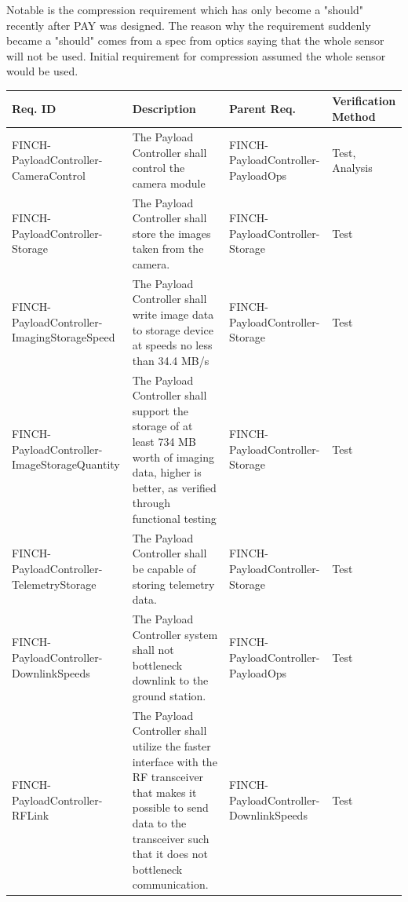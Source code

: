 \documentclass[12pt,a4paper]{article}
\begin{document}
Notable is the compression requirement which has only become a "should" recently after PAY was designed. The reason why the requirement suddenly became a "should" comes from a spec from optics saying that the whole sensor will not be used. Initial requirement for compression assumed the whole sensor would be used. 

    \begin{table}[H]
        \centering
        \begin{tabular}{|>{\centering\arraybackslash}m{3cm} 
                    |>{\raggedright\arraybackslash}m{7cm} 
                    |>{\centering\arraybackslash}m{3cm} 
                    |>{\centering\arraybackslash}m{2.5cm}|}\hline
            \textbf{Req. ID} & \centering \textbf{Description} & \textbf{Parent Req.} & \textbf{Verification Method}\\\hline
 FINCH-PayloadController-CameraControl& The Payload Controller shall control the camera module& FINCH-PayloadController-PayloadOps&Test, Analysis\\\hline
 FINCH-PayloadController-Storage& The Payload Controller shall store the images taken from the camera.& FINCH-PayloadController-Storage&Test\\\hline
 FINCH-PayloadController-ImagingStorageSpeed& The Payload Controller shall write image data to storage device at speeds no less than 34.4 MB/s& FINCH-PayloadController-Storage&Test\\\hline
 FINCH-PayloadController-ImageStorageQuantity& The Payload Controller shall support the storage of at least 734 MB worth of imaging data, higher is better, as verified through functional testing& FINCH-PayloadController-Storage&Test\\\hline
 FINCH-PayloadController-TelemetryStorage& The Payload Controller shall be capable of storing telemetry data.& FINCH-PayloadController-Storage&Test\\\hline
 FINCH-PayloadController-DownlinkSpeeds& The Payload Controller system shall not bottleneck downlink to the ground station. & FINCH-PayloadController-PayloadOps&Test\\\hline
 FINCH-PayloadController-RFLink& The Payload Controller shall utilize the faster interface with the RF transceiver that makes it possible to send data to the transceiver such that it does not bottleneck communication.& FINCH-PayloadController-DownlinkSpeeds&Test\\\hline

\end{tabular}
\end{table}
\end{document}
